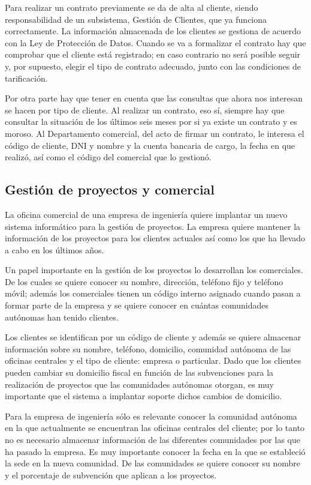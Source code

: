 \documentclass{db-practice}
\begin{document}
Para realizar un contrato previamente se da de alta al cliente, siendo responsabilidad de un subsistema, Gestión de Clientes, que ya funciona correctamente. La información almacenada de los clientes se gestiona de acuerdo con la Ley de Protección de Datos. Cuando se va a formalizar el contrato hay que comprobar que el cliente está registrado; en caso contrario no será posible seguir y, por supuesto, elegir el tipo de contrato adecuado, junto con las condiciones de tarificación. 

Por otra parte hay que tener en cuenta que las consultas que ahora nos interesan se hacen por tipo de cliente. Al realizar un contrato, eso sí, siempre hay que consultar la situación de los últimos seis meses por si ya existe un contrato y es moroso. Al Departamento comercial, del acto de firmar un contrato, le interesa el código de cliente, DNI y nombre y la cuenta bancaria de cargo, la fecha en que realizó, así como el código del comercial que lo gestionó.

\subsection{Gestión de proyectos y comercial}

La oficina comercial de una empresa de ingeniería quiere implantar un nuevo sistema informático para la gestión de proyectos. La empresa quiere mantener la información de  los proyectos para los clientes actuales así como los que ha llevado a cabo en los últimos años. 

Un papel importante en la gestión de los proyectos lo desarrollan los comerciales. De los cuales se quiere conocer su nombre, dirección, teléfono fijo y teléfono móvil; además los comerciales tienen un código interno asignado cuando pasan a formar parte de la empresa y se quiere conocer en cuántas comunidades autónomas han tenido clientes.

Los clientes se identifican por un código de cliente y además se quiere almacenar información sobre su nombre, teléfono, domicilio, comunidad autónoma de las oficinas centrales y el tipo de cliente: empresa o particular. Dado que los clientes pueden cambiar su domicilio fiscal en función de las subvenciones para la realización de proyectos que las comunidades autónomas otorgan, es muy importante que el sistema a implantar soporte dichos cambios de domicilio.

Para la empresa de ingeniería sólo es relevante conocer la comunidad autónoma en la que actualmente se encuentran las oficinas centrales del cliente; por lo tanto no es necesario almacenar información de las diferentes comunidades por las que ha pasado la empresa. Es muy importante conocer la fecha en la que se estableció la sede en la nueva comunidad. De las comunidades se quiere conocer su nombre y el porcentaje de subvención que aplican a los proyectos.
\end{document}
